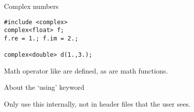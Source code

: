  {Complex numbers}
\label{sec:stl-complex}

\begin{verbatim}
#include <complex>
complex<float> f;
f.re = 1.; f.im = 2.;

complex<double> d(1.,3.);
\end{verbatim}
Math operator like \n{+,*} are defined, as are math functions.

 {About the `using' keyword}

Only use this internally, not in header files that the user sees.
